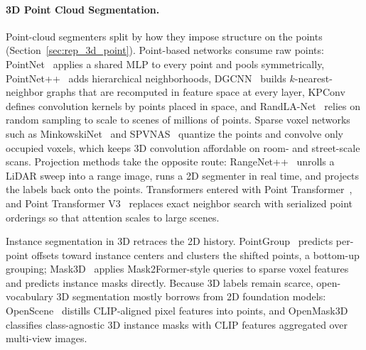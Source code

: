 \paragraph{3D Point Cloud Segmentation.}
Point-cloud segmenters split by how they impose structure on the points (Section~\ref{sec:rep_3d_point}). Point-based networks consume raw points: PointNet~\cite{qi2017pointnet} applies a shared MLP to every point and pools symmetrically, PointNet++~\cite{qi2017pointnetplus} adds hierarchical neighborhoods, DGCNN~\cite{wang2019dgcnn} builds $k$-nearest-neighbor graphs that are recomputed in feature space at every layer, KPConv~\cite{thomas2019kpconv} defines convolution kernels by points placed in space, and RandLA-Net~\cite{hu2020randlanet} relies on random sampling to scale to scenes of millions of points. Sparse voxel networks such as MinkowskiNet~\cite{choy2019minkowski} and SPVNAS~\cite{tang2020searching} quantize the points and convolve only occupied voxels, which keeps 3D convolution affordable on room- and street-scale scans. Projection methods take the opposite route: RangeNet++~\cite{milioto2019rangenet} unrolls a LiDAR sweep into a range image, runs a 2D segmenter in real time, and projects the labels back onto the points. Transformers entered with Point Transformer~\cite{zhao2021point}, and Point Transformer V3~\cite{wu2024ptv3} replaces exact neighbor search with serialized point orderings so that attention scales to large scenes.

Instance segmentation in 3D retraces the 2D history. PointGroup~\cite{jiang2020pointgroup} predicts per-point offsets toward instance centers and clusters the shifted points, a bottom-up grouping; Mask3D~\cite{schult2023mask3d} applies Mask2Former-style queries to sparse voxel features and predicts instance masks directly. Because 3D labels remain scarce, open-vocabulary 3D segmentation mostly borrows from 2D foundation models: OpenScene~\cite{peng2023openscene} distills CLIP-aligned pixel features into points, and OpenMask3D~\cite{takmaz2023openmask3d} classifies class-agnostic 3D instance masks with CLIP features aggregated over multi-view images.



